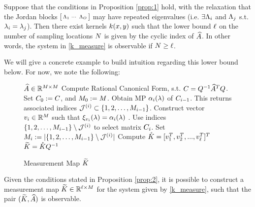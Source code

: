 \begin{proposition}\label{prop:2}
 Suppose that the conditions in Proposition \ref{prop:1} hold, with the relaxation that
 the Jordan blocks $\left[\begin{smallmatrix}
                           \Lambda_1 &\cdots & \Lambda_{O}
                          \end{smallmatrix}\right]$ may have 
 repeated eigenvalues (i.e. $\exists \Lambda_i$ and $\Lambda_j$ s.t. $\lambda_i = \lambda_j$). 
 Then there exist kernels $k(x,y)$ such that 
 the lower bound $\ell$ on the number of sampling locations $N$ is given by the cyclic index of $\widehat{A}$. In other words, the system in \eqref{k_measure} is observable if $ N \geq \ell$.
\end{proposition}

We will give a concrete example to build intuition regarding this lower bound below. For now, we note the following:
\begin{figure}[t!]
	\begin{algorithm}[H]
		\caption{Measurement Map $\widetilde{K}$}
		\label{alg:measmap}
		\begin{algorithmic}
				 $\widehat{A}\in\mathbb{R}^{M\times M}$
				\STATE Compute Rational Canonical Form, s.t. $C = Q^{-1}\widehat{A}^TQ$. Set $C_0:=C$, and
				$M_0:=M$. 
				\STATE Obtain MP $\alpha_i(\lambda)$ of $C_{i-1}$. 
				This returns associated indices $\mathcal{J}^{({i})}\subset\{1,2,\dots,M_{i-1}\}$. 
				\STATE Construct vector $v_i \in \mathbb{R}^{M}$ such that 
				$\xi_{v_i}(\lambda)=\alpha_{i}(\lambda)$ .
				\STATE Use indices $\{1,2,\dots,M_{i-1}\}\setminus\mathcal{J}^{({i})}$ to select matrix $C_i$. Set 
				$M_i:= |\{1,2,\dots,M_{i-1}\}\setminus\mathcal{J}^{({i})}|$
				\ENDFOR
				\STATE Compute $ \mathring{K} = [v_1^T, v_2^T,...,v_{\ell}^T]^T$
				 $\widetilde{K} =\mathring{K}Q^{-1}$
		\end{algorithmic}
	\end{algorithm}
\end{figure}
\begin{proposition}\label{prop:3}
Given the conditions stated in Proposition \ref{prop:2}, it is possible to construct a measurement map $\widetilde{K} \in \mathbb{R}^{\ell\times M}$ for the system given by \eqref{k_measure}, such that the pair $(\widetilde{K}, \widehat{A})$ is observable.
\end{proposition}

